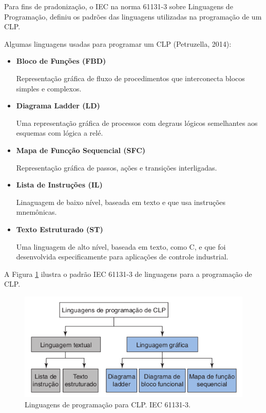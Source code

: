 \documentclass[a4paper, 12pt]{article}
\begin{document}
		Para fins de pradonização, o IEC na norma 61131-3 sobre Linguagens de Programação,
		definiu os padrões das linguagens utilizadas na programação de um CLP.

		Algumas linguagens usadas para programar um CLP (Petruzella, 2014):
		
		\begin{itemize}
			\item \textbf{Bloco de Funções (FBD)}
			
				Representação gráfica de fluxo de procedimentos que interconecta blocos simples
				e complexos.
				
			\item \textbf{Diagrama Ladder (LD)}
			
				Uma representação gráfica de processos com degraus lógicos semelhantes aos esquemas
				com lógica a relé.
				
			\item \textbf{Mapa de Funcção Sequencial (SFC)}
			
				Representação gráfica de passos, ações e transições interligadas.
				
			\item \textbf{Lista de Instruções (IL)}
			
				Linaguagem de baixo nível, baseada em texto e que usa instruções mnemônicas.
				
			\item \textbf{Texto Estruturado (ST)}
			
				Uma linguagem de alto nível, baseada em texto, como C, e que foi desenvolvida
				especificamente para aplicações de controle industrial.
				
		\end{itemize}
		
		A Figura \ref{fig:progam-language-clp} ilustra o padrão IEC 61131-3 de linguagens para a programação de CLP.

		\begin{figure}[H]
			\centering
			\includegraphics[scale=0.5]{figures/programming_language_for_CLP_IEC-61131-3.png}
			\caption{Linguagens de programação para CLP. IEC 61131-3.}
			\label{fig:progam-language-clp}
		\end{figure}
		
\end{document}

